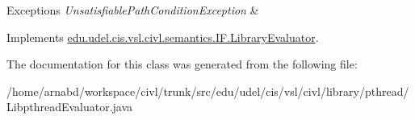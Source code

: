 \begin{DoxyExceptions}{Exceptions}
{\em Unsatisfiable\+Path\+Condition\+Exception} & \\
\hline
\end{DoxyExceptions}


Implements \hyperlink{interfaceedu_1_1udel_1_1cis_1_1vsl_1_1civl_1_1semantics_1_1IF_1_1LibraryEvaluator_a36d4bbd355cb9544feaaf0979280c70b}{edu.\+udel.\+cis.\+vsl.\+civl.\+semantics.\+I\+F.\+Library\+Evaluator}.



The documentation for this class was generated from the following file\+:\begin{DoxyCompactItemize}
\item 
/home/arnabd/workspace/civl/trunk/src/edu/udel/cis/vsl/civl/library/pthread/Libpthread\+Evaluator.\+java\end{DoxyCompactItemize}
